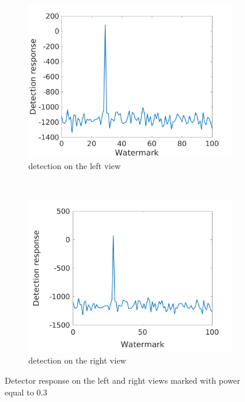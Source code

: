 \begin{figure}[h!]
    \centering
    \begin{subfigure}[t]{0.5\textwidth}
        \centering
       \includegraphics[width=1\textwidth]{./img/likelihood/correct_LikelihoodL_03.png}
          \caption{\small{detection on the left view}}
          \label{fig:Ll03}

    \end{subfigure}%
    ~ 
    \begin{subfigure}[t]{0.5\textwidth}
        \centering
        \includegraphics[width=1\textwidth]{./img/likelihood/correct_LikelihoodLr_03.png}
           \caption{\small{detection on the right view}}
           \label{fig:Lr03}
    \end{subfigure}
    \caption{Detector response on the left and right views marked with power equal to 0.3}
     \label{fig:Lr}
\end{figure}
